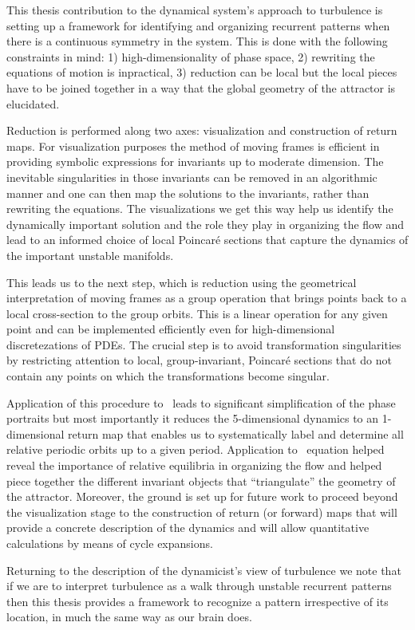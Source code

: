
This thesis contribution to the dynamical system's approach to turbulence is
setting up a framework for identifying and organizing recurrent patterns when there
is a continuous symmetry in the system. This is done with the following constraints
in mind: 1) high-dimensionality of phase space, 2) rewriting the equations of motion
is inpractical, 3) reduction can be local but the local pieces have to be joined together
in a way that the global geometry of the attractor is elucidated.

Reduction is performed along two axes: visualization and construction of return maps.
For visualization purposes the method of moving frames is efficient in providing 
symbolic expressions for invariants up to moderate dimension. The inevitable singularities
in those invariants can be removed in an algorithmic manner and one can then map the
solutions to the invariants, rather than rewriting the equations. The visualizations
we get this way help us identify the dynamically important solution and the role they
play in organizing the flow and lead to an informed choice of local Poincar\'e sections
that capture the dynamics of the important unstable manifolds.

This leads us to the next step, which is reduction using the geometrical interpretation
of moving frames as a group operation that brings points back to a local cross-section to the
group orbits. This is a linear operation for any given point and can be implemented efficiently
even for high-dimensional discretezations of PDEs. The crucial step is to avoid transformation
singularities by restricting attention to local, group-invariant, Poincar\'e sections that
do not contain any points on which the transformations become singular.

Application of this procedure to \CLe\ leads to significant simplification of the phase portraits
but most importantly it reduces the 5-dimensional dynamics to an 1-dimensional return map that enables us to systematically label and determine all relative periodic orbits up to a given period. Application
to \KS\ equation helped reveal the importance of relative equilibria in organizing the flow and helped piece together the different invariant objects that ``triangulate'' the geometry of the attractor.
Moreover, the ground is set up for future work to proceed beyond the visualization stage to the construction of return (or forward) maps that will provide a concrete description of the dynamics
and will allow quantitative calculations by means of cycle expansions.

Returning to the description of the dynamicist's view of turbulence we note that if we are to
interpret turbulence as a walk through unstable recurrent patterns then this thesis provides
a framework to recognize a pattern irrespective of its location, in much the same way as our brain
does.

